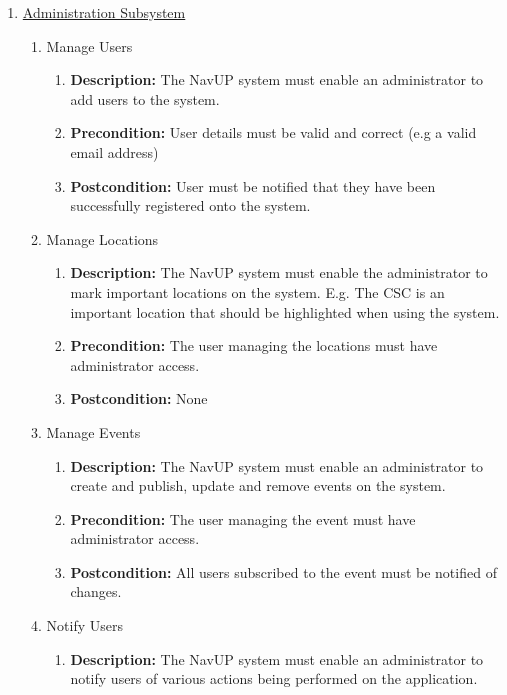\documentclass{article}
\begin{document}
\begin{enumerate}
	\item \underline{Administration Subsystem}
	\begin{enumerate}
			
		\item Manage Users
		\begin{enumerate}
			\item \textbf{Description:} The NavUP system must enable an administrator to add users to the system. 
			\item \textbf{Precondition:} User details must be valid and correct (e.g a valid email address) 
			\item \textbf{Postcondition:} User must be notified that they have been successfully registered onto the system.
			
		\end{enumerate}
		
		\item Manage Locations
		\begin{enumerate}
			\item \textbf{Description:}  The NavUP system must enable the administrator to mark important locations on the system. E.g. The CSC is an important location that should be highlighted when using the system. 
			\item \textbf{Precondition:} The user managing the locations must have administrator access. 
			\item \textbf{Postcondition:} None			
		\end{enumerate}
		
		\item Manage Events
		\begin{enumerate}
			\item \textbf{Description:} The NavUP system must enable an administrator to create and publish, update and remove events on the system. 
			\item \textbf{Precondition:} The user managing the event must have administrator access. 
			\item \textbf{Postcondition:} All users subscribed to the event must be notified of changes.  \newline			
		\end{enumerate}	
		
		\item Notify Users
		\begin{enumerate}
			\item \textbf{Description:} The NavUP system must enable an administrator to notify users of various actions being performed on the application. 
			

\end{enumerate}
\end{enumerate}
\end{enumerate}
\end{document}
